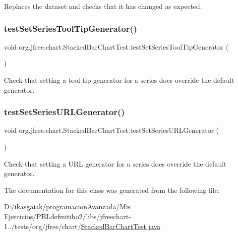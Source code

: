 Replaces the dataset and checks that it has changed as expected. \mbox{\label{classorg_1_1jfree_1_1chart_1_1_stacked_bar_chart_test_a2d628d1b8ec196f5f855b5a9523ea2e4}} 
\subsubsection{\texorpdfstring{test\+Set\+Series\+Tool\+Tip\+Generator()}{testSetSeriesToolTipGenerator()}}
{\footnotesize\ttfamily void org.\+jfree.\+chart.\+Stacked\+Bar\+Chart\+Test.\+test\+Set\+Series\+Tool\+Tip\+Generator (\begin{DoxyParamCaption}{ }\end{DoxyParamCaption})}

Check that setting a tool tip generator for a series does override the default generator. \mbox{\label{classorg_1_1jfree_1_1chart_1_1_stacked_bar_chart_test_a944f9530fd6837fe964aed77ea67be80}} 
\subsubsection{\texorpdfstring{test\+Set\+Series\+U\+R\+L\+Generator()}{testSetSeriesURLGenerator()}}
{\footnotesize\ttfamily void org.\+jfree.\+chart.\+Stacked\+Bar\+Chart\+Test.\+test\+Set\+Series\+U\+R\+L\+Generator (\begin{DoxyParamCaption}{ }\end{DoxyParamCaption})}

Check that setting a U\+RL generator for a series does override the default generator. 

The documentation for this class was generated from the following file\+:\begin{DoxyCompactItemize}
\item 
D\+:/ikasgaiak/programacion\+Avanzada/\+Mis Ejercicios/\+P\+B\+Ldefinitibo2/libs/jfreechart-\/1../tests/org/jfree/chart/\mbox{\hyperlink{_stacked_bar_chart_test_8java}{Stacked\+Bar\+Chart\+Test.\+java}}\end{DoxyCompactItemize}
